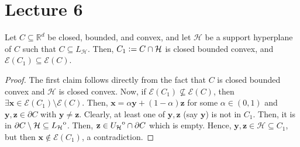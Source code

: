 \section{Lecture 6}

\begin{lem}
    Let $C \subseteq \mathbb{R}^d$ be closed, bounded, and convex, and let $\mathcal{H}$ be a support hyperplane of $C$ such that $C \subseteq L_{\mathcal{H}}$. Then, $C_1 \vcentcolon= C \cap \mathcal{H}$ is closed bounded convex, and $\mathcal{E}(C_1) \subseteq \mathcal{E}(C)$. 
\end{lem}
\begin{proof}
    The first claim follows directly from the fact that $C$ is closed bounded convex and $\mathcal{H}$ is closed convex. Now, if $\mathcal{E}(C_1) \not\subseteq \mathcal{E}(C)$, then $\exists \mathbf{x} \in \mathcal{E}(C_1) \setminus \mathcal{E}(C)$. Then, $\mathbf{x} = \alpha\mathbf{y} + (1-\alpha)\mathbf{z}$ for some $\alpha \in (0,1)$ and $\mathbf{y}, \mathbf{z} \in \partial C$ with $\mathbf{y} \neq \mathbf{z}$. Clearly, at least one of $\mathbf{y}, \mathbf{z}$ (say $\mathbf{y}$) is not in $C_1$. Then, it is in $\partial C \setminus \mathcal{H} \subseteq {\kern0ptL_{\mathcal{H}}}^{\mathrm{o}}$. Then, $\mathbf{z} \in {\kern0ptU_{\mathcal{H}}}^{\mathrm{o}} \cap \partial C$ which is empty. Hence, $\mathbf{y}, \mathbf{z} \in \mathcal{H} \subseteq C_1$, but then $\mathbf{x} \notin \mathcal{E}(C_1)$, a contradiction.
\end{proof}

